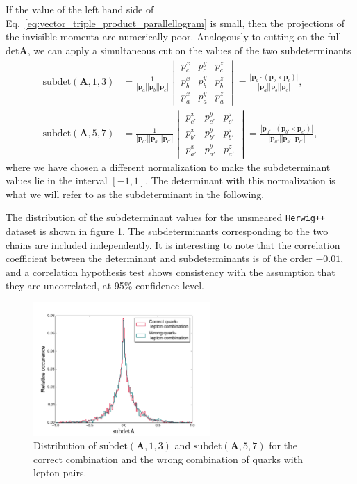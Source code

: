 \documentclass[twoside,english]{uiofysmaster}
\begin{document}
If the value of the left hand side of Eq.\ \eqref{eq:vector_triple_product_parallellogram} is small, then the projections of the invisible momenta are numerically poor. Analogously to cutting on the full $\mathrm{det}\mathbf{A}$, we can apply a simultaneous cut on the values of the two subdeterminants
\begin{align}
	\mathrm{subdet}(\mathbf{A}, 1,3) &= \frac{1}{|\mathbf p_a||\mathbf p_b||\mathbf p_c|}
	\begin{vmatrix}p_c^x & p_c^y & p_c^z\\
	p_b^x & p_b^y & p_b^z\\
	p_a^x & p_a^y & p_a^z\end{vmatrix} = \frac{\left| \mathbf p_a \cdot \left( \mathbf p_b \times \mathbf p_c \right) \right| }{|\mathbf p_a||\mathbf p_b||\mathbf p_c|}, \\
	\mathrm{subdet}(\mathbf{A}, 5,7) &= \frac{1}{|\mathbf p_{a'}||\mathbf p_{b'}||\mathbf p_{c'}|}
	\begin{vmatrix}	p_{c'}^x & p_{c'}^y & p_{c'}^z\\
					p_{b'}^x & p_{b'}^y & p_{b'}^z\\
					p_{a'}^x & p_{a'}^y & p_{a'}^z\end{vmatrix} = \frac{\left| \mathbf p_{a'} \cdot \left( \mathbf p_{b'} \times \mathbf p_{c'} \right) \right| }{|\mathbf p_{a'}||\mathbf p_{b'}||\mathbf p_{c'}|},
\end{align}
where we have chosen a different normalization to make the subdeterminant values lie in the interval $[-1,1]$. The determinant with this normalization is what we will refer to as the subdeterminant in the following.

The distribution of the subdeterminant values for the unsmeared {\tt Herwig++} dataset is shown in figure \ref{fig:subdetA_distribution}. The subdeterminants corresponding to the two chains are included independently. It is interesting to note that the correlation coefficient between the determinant and subdeterminants is of the order $-0.01$, and a correlation hypothesis test shows consistency with the assumption that they are uncorrelated, at 95\% confidence level. 
\begin{figure}[hbt]
	\centering
		\includegraphics[width=0.6\textwidth]{figures/improving_combinatorics/subdetA_distribution_herwigpp.pdf} 
	\caption{Distribution of $\mathrm{subdet}(\mathbf{A},1,3)$ and $\mathrm{subdet}(\mathbf{A},5,7)$ for the correct combination and  the wrong combination of quarks with lepton pairs.}
	\label{fig:subdetA_distribution}
\end{figure}
\end{document}
